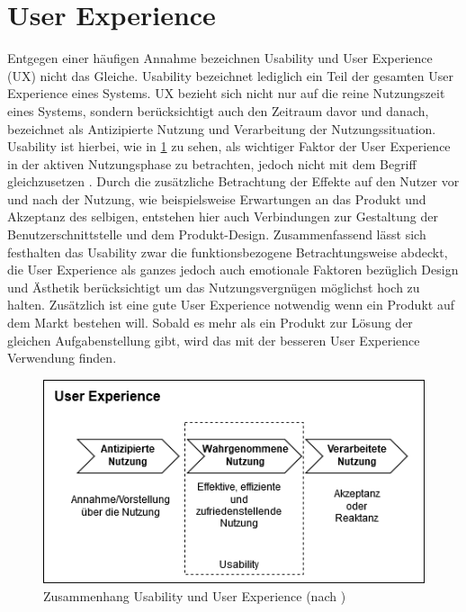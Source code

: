 \section{User Experience}
Entgegen einer häufigen Annahme bezeichnen Usability und User Experience (UX) nicht das Gleiche.
Usability bezeichnet lediglich ein Teil der gesamten User Experience eines Systems\cite{Knight.2019c}.
UX bezieht sich nicht nur auf die reine Nutzungszeit eines Systems, sondern berücksichtigt auch den Zeitraum davor und danach, bezeichnet als Antizipierte Nutzung und Verarbeitung der Nutzungssituation.
Usability ist hierbei, wie in \cref{fig:UX} zu sehen,  als wichtiger Faktor der User Experience in der aktiven Nutzungsphase zu betrachten, jedoch nicht mit dem Begriff gleichzusetzen \cite{Sarodnick.2016}.
Durch die zusätzliche Betrachtung der Effekte auf den Nutzer vor und nach der Nutzung, wie beispielsweise Erwartungen an das Produkt und Akzeptanz des selbigen, entstehen hier auch Verbindungen zur Gestaltung der Benutzerschnittstelle und dem Produkt-Design\cite{Richter.2016}.
Zusammenfassend lässt sich festhalten das Usability zwar die funktionsbezogene Betrachtungsweise abdeckt, die User Experience als ganzes jedoch auch emotionale Faktoren bezüglich Design und Ästhetik berücksichtigt um das Nutzungsvergnügen möglichst hoch zu halten.
Zusätzlich ist eine gute User Experience notwendig wenn ein Produkt auf dem Markt bestehen will.
Sobald es mehr als ein Produkt zur Lösung der gleichen Aufgabenstellung gibt, wird das mit der besseren User Experience Verwendung finden\cite{Knight.2019c}.

\begin{figure} [!h]
\begin{center}
  \includegraphics[scale=0.7]{figures/UX.png}
  \caption{Zusammenhang Usability und User Experience (nach \cite{Sarodnick.2016})}
  \label{fig:UX}
\end{center}
\end{figure}

